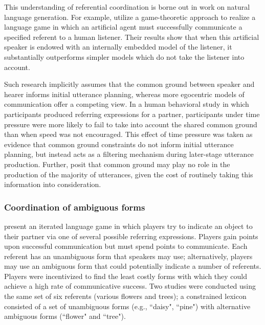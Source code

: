 \documentclass[a4paper,11pt]{article}
\begin{document}
This understanding of referential coordination is borne out in work on natural language generation. For example,  utilize a game-theoretic approach to realize a language game in which an artificial agent must successfully communicate a specified referent to a human listener. Their results show that when this artificial speaker is endowed with an internally embedded model of the listener, it substantially outperforms simpler models which do not take the listener into account.

Such research implicitly assumes that the common ground between speaker and hearer informs initial utterance planning, whereas more egocentric models of communication offer a competing view. In a human behavioral study \cite{horton1996} in which participants produced referring expressions for a partner, participants under time pressure were more likely to fail to take into account the shared common ground than when speed was not encouraged. This effect of time pressure was taken as evidence that common ground constraints do not inform initial utterance planning, but instead acts as a filtering mechanism during later-stage utterance production. Further,  posit that common ground may play no role in the production of the majority of utterances, given the cost of routinely taking this information into consideration.

\subsubsection{Coordination of ambiguous forms}
 present an iterated language game in which players try to indicate an object to their partner via one of several possible referring expressions. Players gain points upon successful communication but must spend points to communicate. Each referent has an unambiguous form that speakers may use; alternatively, players may use an ambiguous form that could potentially indicate a number of referents. Players were incentivized to find the least costly forms with which they could achieve a high rate of communicative success. Two studies were conducted using the same set of six referents (various flowers and trees); a constrained lexicon consisted of a set of unambiguous forms (e.g., ``daisy", ``pine") with alternative ambiguous forms (``flower" and ``tree").
\end{document}
